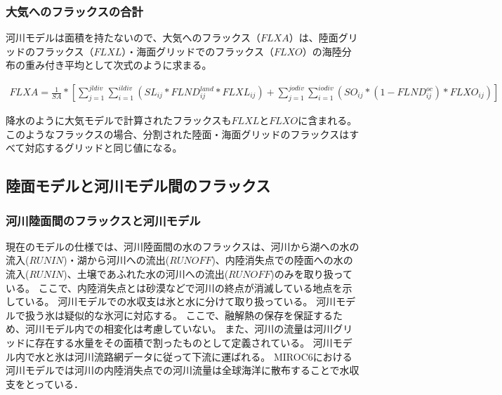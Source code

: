 \hypertarget{ux5927ux6c17ux3078ux306eux30d5ux30e9ux30c3ux30afux30b9ux306eux5408ux8a08}{%
\subsubsection{大気へのフラックスの合計}\label{ux5927ux6c17ux3078ux306eux30d5ux30e9ux30c3ux30afux30b9ux306eux5408ux8a08}}

河川モデルは面積を持たないので、大気へのフラックス（\(FLXA\)）は、陸面グリッドのフラックス（\(FLXL\)）・海面グリッドでのフラックス（\(FLXO\)）の海陸分布の重み付き平均として次式のように求まる。

\begin{eqnarray} FLXA = \frac{1}{SA} * [ \sum _ {j=1}^{jldiv} \sum_{i=1}^{ildiv}(SL _ {ij} * FLND^{land} _ {ij}*FLXL_{ij}) + \sum _ {j=1}^{jodiv}\sum _ {i=1}^{iodiv}(SO _ {ij} * (1-FLND^{oc} _ {ij}) * FLXO _ {ij})] \end{eqnarray}

降水のように大気モデルで計算されたフラックスも\(FLXL\)と\(FLXO\)に含まれる。
このようなフラックスの場合、分割された陸面・海面グリッドのフラックスはすべて対応するグリッドと同じ値になる。

\hypertarget{ux9678ux9762ux30e2ux30c7ux30ebux3068ux6cb3ux5dddux30e2ux30c7ux30ebux9593ux306eux30d5ux30e9ux30c3ux30afux30b9}{%
\subsection{陸面モデルと河川モデル間のフラックス}\label{ux9678ux9762ux30e2ux30c7ux30ebux3068ux6cb3ux5dddux30e2ux30c7ux30ebux9593ux306eux30d5ux30e9ux30c3ux30afux30b9}}

\hypertarget{ux6cb3ux5dddux9678ux9762ux9593ux306eux30d5ux30e9ux30c3ux30afux30b9ux3068ux6cb3ux5dddux30e2ux30c7ux30eb}{%
\subsubsection{河川陸面間のフラックスと河川モデル}\label{ux6cb3ux5dddux9678ux9762ux9593ux306eux30d5ux30e9ux30c3ux30afux30b9ux3068ux6cb3ux5dddux30e2ux30c7ux30eb}}

現在のモデルの仕様では、河川陸面間の水のフラックスは、河川から湖への水の流入(\(RUNIN\))・湖から河川への流出(\(RUNOFF\))、内陸消失点での陸面への水の流入(\(RUNIN\))、土壌であふれた水の河川への流出(\(RUNOFF\))のみを取り扱っている。
ここで、内陸消失点とは砂漠などで河川の終点が消滅している地点を示している。
河川モデルでの水収支は氷と水に分けて取り扱っている。
河川モデルで扱う氷は疑似的な氷河に対応する。
ここで、融解熱の保存を保証するため、河川モデル内での相変化は考慮していない。
また、河川の流量は河川グリッドに存在する水量をその面積で割ったものとして定義されている。
河川モデル内で水と氷は河川流路網データに従って下流に運ばれる。
MIROC6における河川モデルでは河川の内陸消失点での河川流量は全球海洋に散布することで水収支をとっている．

